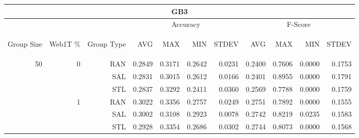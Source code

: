 \begin{center}
\begin{table}[htbp] 
 \begin{center}
\begin{tabular}{ | r | r | r | r | r | r | r | r | r | r | r |}
\hline
\multicolumn{11}{|c|}{GB3}\\
\hline
 & & & \multicolumn{4}{|c|}{Accuracy} & \multicolumn{4}{|c|}{F-Score}\\ \cline{4-11}
\begin{sideways}Group Size\end{sideways} & \begin{sideways}Web1T \%\end{sideways} & \begin{sideways}Group Type\end{sideways} & \begin{sideways}AVG\end{sideways} & \begin{sideways}MAX\end{sideways} & \begin{sideways}MIN\end{sideways} & \begin{sideways}STDEV\end{sideways} & \begin{sideways}AVG\end{sideways} & \begin{sideways}MAX\end{sideways} & \begin{sideways}MIN\end{sideways} & \begin{sideways}STDEV\end{sideways}\\
\hline
\multirow{18}{*}{50}
 & \multirow{3}{*}{0} & RAN & 0.2849 & 0.3171 & 0.2642 & 0.0231 & 0.2400 & 0.7606 & 0.0000 & 0.1753\\ \cline{3-11}
 &   & SAL & 0.2831 & 0.3015 & 0.2612 & 0.0166 & 0.2401 & 0.8955 & 0.0000 & 0.1791\\ \cline{3-11}
 &   & STL & 0.2837 & 0.3292 & 0.2411 & 0.0360 & 0.2569 & 0.7788 & 0.0000 & 0.1759\\ \cline{2-11}
 & \multirow{3}{*}{1} & RAN & 0.3022 & 0.3356 & 0.2757 & 0.0249 & 0.2751 & 0.7892 & 0.0000 & 0.1555\\ \cline{3-11}
 &   & SAL & 0.3002 & 0.3108 & 0.2923 & 0.0078 & 0.2742 & 0.8219 & 0.0235 & 0.1583\\ \cline{3-11}
 &   & STL & 0.2928 & 0.3354 & 0.2686 & 0.0302 & 0.2744 & 0.8073 & 0.0000 & 0.1568\\ \cline{2-11}

\end{tabular}
\end{center}
\end{table}
\end{center}
